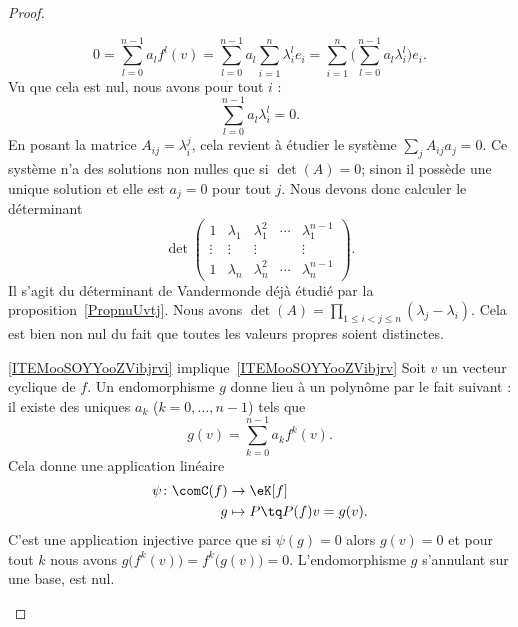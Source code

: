 \begin{proof}
\begin{subproof}
            \begin{equation}
                    0=\sum_{l=0}^{n-1}a_lf^l(v)=\sum_{l=0}^{n-1}a_l\sum_{i=1}^n\lambda_i^le_i=\sum_{i=1}^n\Big( \sum_{l=0}^{n-1}a_l\lambda_i^l \Big)e_i.
            \end{equation}
            Vu que cela est nul, nous avons pour tout \( i\) :
            \begin{equation}
                \sum_{l=0}^{n-1}a_l\lambda_i^l=0.
            \end{equation}
            En posant la matrice \( A_{ij}=\lambda_i^j\), cela revient à étudier le système \( \sum_j A_{ij}a_j=0\). Ce système n'a des solutions non nulles que si \( \det(A)= 0\); sinon il possède une unique solution et elle est \( a_j=0\) pour tout \( j\). Nous devons donc calculer le déterminant
            \begin{equation}
                \det\begin{pmatrix}
                    1&\lambda_1&\lambda_1^2&\cdots&\lambda_1^{n-1}\\
                    \vdots&\vdots&\vdots&&\vdots\\
                    1&\lambda_n&\lambda_n^2&\cdots&\lambda_n^{n-1}
                \end{pmatrix}.
            \end{equation}
            Il s'agit du déterminant de Vandermonde déjà étudié par la proposition~\ref{PropnuUvtj}. Nous avons \( \det(A)=\prod_{1\leq i<j\leq n}(\lambda_j-\lambda_i)\). Cela est bien non nul du fait que toutes les valeurs propres soient distinctes.
        \item[\ref{ITEMooSOYYooZVibjrvi} implique~\ref{ITEMooSOYYooZVibjrv}]
            Soit \( v\) un vecteur cyclique de \( f\). Un endomorphisme \( g\) donne lieu à un polynôme par le fait suivant : il existe des uniques \( a_k\) (\( k=0,\ldots, n-1\)) tels que
            \begin{equation}
                g(v)=\sum_{k=0}^{n-1}a_kf^k(v).
            \end{equation}
            Cela donne une application linéaire
            \begin{equation}
                \begin{aligned}
                    \psi\colon \comC(f)&\to \eK[f] \\
                    g&\mapsto P\tq P(f)v=g(v).
                \end{aligned}
            \end{equation}
            C'est une application injective parce que si \( \psi(g)=0\) alors \( g(v)=0\) et pour tout \( k\) nous avons \( g\big( f^k(v) \big)=f^k\big( g(v) \big)=0\). L'endomorphisme \( g\) s'annulant sur une base, est nul.

\end{subproof}
\end{proof}
